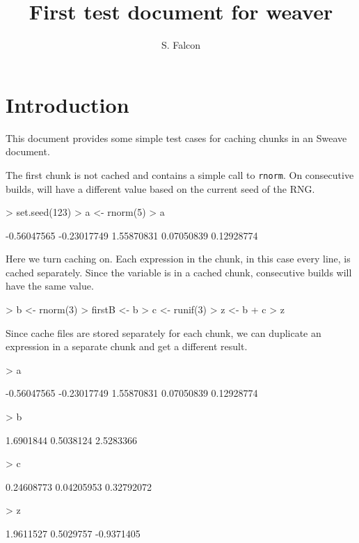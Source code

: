 \documentclass[11pt]{article}
\title{First test document for weaver}
\author{S. Falcon}
\newcommand{\Rfunction}[1]{{\texttt{#1}}}
\begin{document}
\maketitle

\section{Introduction}

This document provides some simple test cases for caching chunks in an
Sweave document.

The first chunk is not cached and contains a simple call to
\Rfunction{rnorm}.  On consecutive builds,  will have a
different value based on the current seed of the RNG.
\begin{Schunk}
\begin{Sinput}
> set.seed(123)
> a <- rnorm(5)
> a
\end{Sinput}
\begin{Soutput}
[1] -0.56047565 -0.23017749  1.55870831  0.07050839  0.12928774
\end{Soutput}
\end{Schunk}

Here we turn caching on.  Each expression in the chunk, in this case
every line, is cached separately.  Since the  variable is in
a cached chunk, consecutive builds will have the same value.

\begin{Schunk}
\begin{Sinput}
> b <- rnorm(3)
> firstB <- b
> c <- runif(3)
> z <- b + c
> z
\end{Sinput}
\end{Schunk}

Since cache files are stored separately for each chunk, we can
duplicate an expression in a separate chunk and get a different
result.


\begin{Schunk}
\begin{Sinput}
> a
\end{Sinput}
\begin{Soutput}
[1] -0.56047565 -0.23017749  1.55870831  0.07050839  0.12928774
\end{Soutput}
\begin{Sinput}
> b
\end{Sinput}
\begin{Soutput}
[1] 1.6901844 0.5038124 2.5283366
\end{Soutput}
\begin{Sinput}
> c
\end{Sinput}
\begin{Soutput}
[1] 0.24608773 0.04205953 0.32792072
\end{Soutput}
\begin{Sinput}
> z
\end{Sinput}
\begin{Soutput}
[1]  1.9611527  0.5029757 -0.9371405
\end{Soutput}
\end{Schunk}
\end{document}
